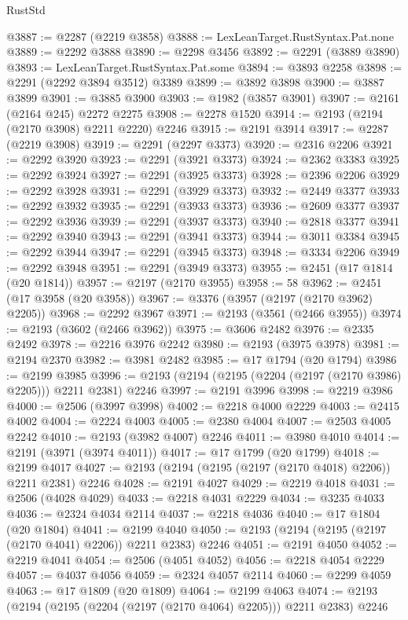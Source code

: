 \begin{lexlean}{RustStd}
\begin{coremodule}
@3887 := @2287 (@2219 @3858)
@3888 := LexLeanTarget.RustSyntax.Pat.none
@3889 := @2292 @3888
@3890 := @2298 @3456
@3892 := @2291 (@3889 @3890)
@3893 := LexLeanTarget.RustSyntax.Pat.some
@3894 := @3893 @2258
@3898 := @2291 (@2292 @3894 @3512) @3389
@3899 := @3892 @3898
@3900 := @3887 @3899
@3901 := @3885 @3900
@3903 := @1982 (@3857 @3901)
@3907 := @2161 (@2164 @245) @2272 @2275
@3908 := @2278 @1520
@3914 := @2193 (@2194 (@2170 @3908) @2211 @2220) @2246
@3915 := @2191 @3914
@3917 := @2287 (@2219 @3908)
@3919 := @2291 (@2297 @3373)
@3920 := @2316 @2206
@3921 := @2292 @3920
@3923 := @2291 (@3921 @3373)
@3924 := @2362 @3383
@3925 := @2292 @3924
@3927 := @2291 (@3925 @3373)
@3928 := @2396 @2206
@3929 := @2292 @3928
@3931 := @2291 (@3929 @3373)
@3932 := @2449 @3377
@3933 := @2292 @3932
@3935 := @2291 (@3933 @3373)
@3936 := @2609 @3377
@3937 := @2292 @3936
@3939 := @2291 (@3937 @3373)
@3940 := @2818 @3377
@3941 := @2292 @3940
@3943 := @2291 (@3941 @3373)
@3944 := @3011 @3384
@3945 := @2292 @3944
@3947 := @2291 (@3945 @3373)
@3948 := @3334 @2206
@3949 := @2292 @3948
@3951 := @2291 (@3949 @3373)
@3955 := @2451 (@17 @1814 (@20 @1814))
@3957 := @2197 (@2170 @3955)
@3958 := 58
@3962 := @2451 (@17 @3958 (@20 @3958))
@3967 := @3376 (@3957 (@2197 (@2170 @3962) @2205))
@3968 := @2292 @3967
@3971 := @2193 (@3561 (@2466 @3955))
@3974 := @2193 (@3602 (@2466 @3962))
@3975 := @3606 @2482
@3976 := @2335 @2492
@3978 := @2216 @3976 @2242
@3980 := @2193 (@3975 @3978)
@3981 := @2194 @2370
@3982 := @3981 @2482
@3985 := @17 @1794 (@20 @1794)
@3986 := @2199 @3985
@3996 := @2193 (@2194 (@2195 (@2204 (@2197 (@2170 @3986) @2205))) @2211 @2381) @2246
@3997 := @2191 @3996
@3998 := @2219 @3986
@4000 := @2506 (@3997 @3998)
@4002 := @2218 @4000 @2229
@4003 := @2415 @4002
@4004 := @2224 @4003
@4005 := @2380 @4004
@4007 := @2503 @4005 @2242
@4010 := @2193 (@3982 @4007) @2246
@4011 := @3980 @4010
@4014 := @2191 (@3971 (@3974 @4011))
@4017 := @17 @1799 (@20 @1799)
@4018 := @2199 @4017
@4027 := @2193 (@2194 (@2195 (@2197 (@2170 @4018) @2206)) @2211 @2381) @2246
@4028 := @2191 @4027
@4029 := @2219 @4018
@4031 := @2506 (@4028 @4029)
@4033 := @2218 @4031 @2229
@4034 := @3235 @4033
@4036 := @2324 @4034 @2114
@4037 := @2218 @4036
@4040 := @17 @1804 (@20 @1804)
@4041 := @2199 @4040
@4050 := @2193 (@2194 (@2195 (@2197 (@2170 @4041) @2206)) @2211 @2383) @2246
@4051 := @2191 @4050
@4052 := @2219 @4041
@4054 := @2506 (@4051 @4052)
@4056 := @2218 @4054 @2229
@4057 := @4037 @4056
@4059 := @2324 @4057 @2114
@4060 := @2299 @4059
@4063 := @17 @1809 (@20 @1809)
@4064 := @2199 @4063
@4074 := @2193 (@2194 (@2195 (@2204 (@2197 (@2170 @4064) @2205))) @2211 @2383) @2246

\end{coremodule}
\end{lexlean}
